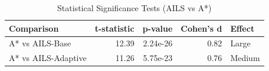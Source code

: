 
\begin{table}[htbp]
\centering
\caption{Statistical Significance Tests (AILS vs A*)}
\label{tab:hypothesis_tests}
\begin{tabular}{lrrrl}
\toprule
\textbf{Comparison} & \textbf{t-statistic} & \textbf{p-value} & \textbf{Cohen's d} & \textbf{Effect} \\
\midrule
A* vs AILS-Base & 12.39 & 2.24e-26 & 0.82 & Large \\
A* vs AILS-Adaptive & 11.26 & 5.75e-23 & 0.76 & Medium \\

\bottomrule
\end{tabular}
\end{table}

